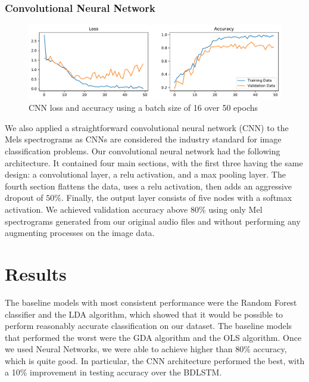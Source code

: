 \documentclass[11pt]{article}
\begin{document}
\subsubsection{Convolutional Neural Network}
\begin{figure}[!htb]
\begin{center}
   \includegraphics[width=0.8\linewidth]{../cnn_models/first_try_loss_acc.pdf}
   \caption{CNN loss and accuracy using a batch size of 16 over 50 epochs}
\end{center}
\end{figure}
We also applied a straightforward convolutional neural network (CNN) to the Mels spectrograms as CNNs are considered the industry standard for image classification problems.
Our convolutional neural network had the following architecture.
It contained four main sections, with the first three having the same design: a convolutional layer, a relu activation, and a max pooling layer.
The fourth section flattens the data, uses a relu activation, then adds an aggressive dropout of $50 \%$.
Finally, the output layer consists of five nodes with a softmax activation. We achieved validation accuracy above 80\% using only Mel spectrograms generated from our original audio files and without performing any augmenting processes on the image data.

\section{Results}
The baseline models with most consistent performance were the Random Forest classifier and the LDA algorithm, which showed that it would be possible to perform reasonably accurate classification on our dataset.
The baseline models that performed the worst were the GDA algorithm and the OLS algorithm.
Once we used Neural Networks, we were able to achieve higher than $ 80 \% $ accuracy, which is quite good. In particular, the CNN architecture performed the best, with a 10\% improvement in testing accuracy over the BDLSTM.
\end{document}
